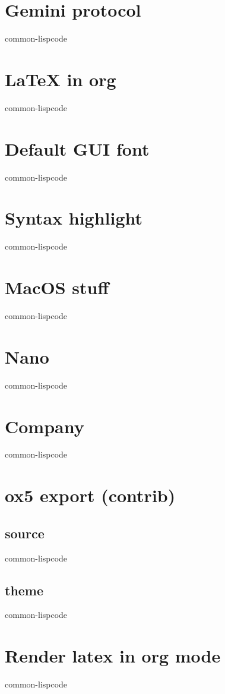 \documentclass[11pt]{article}
\begin{document}
\section{Gemini protocol}
\label{sec:orgea80f24}
common-lispcode
\section{\LaTeX{} in org}
\label{sec:org0251fc7}
common-lispcode
\section{Default GUI font}
\label{sec:org79074de}
common-lispcode
\section{Syntax highlight}
\label{sec:orgffe688d}
common-lispcode
\section{MacOS stuff}
\label{sec:org04d117d}
common-lispcode
\section{Nano}
\label{sec:orgc6a383f}
common-lispcode
\section{Company}
\label{sec:orgbbc17e1}
common-lispcode
\section{ox5 export (contrib)}
\label{sec:orgfa19152}
\subsection{source}
\label{sec:orgae6f91c}
common-lispcode
\subsection{theme}
\label{sec:org48e7263}
common-lispcode
\section{Render latex in org mode}
\label{sec:org9439f99}
common-lispcode
\end{document}
